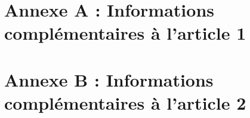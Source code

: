 \documentclass[a4paper,12pt]{book}
\numberwithin{equation}{chapter}
\numberwithin{figure}{chapter}
\numberwithin{table}{chapter}
\begin{document}













\backmatter
\singlespacing




\begin{appendices}
\chapter{Annexe A : Informations complémentaires à l'article 1}

\chapter{Annexe B : Informations complémentaires à l'article 2}

\end{appendices}
\end{document}

